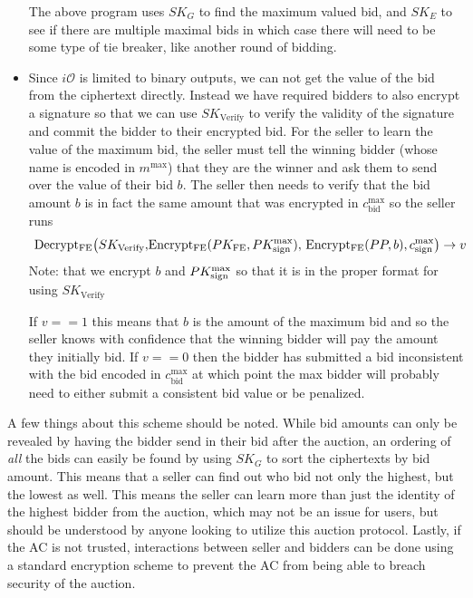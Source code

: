\documentclass[12pt,twoside]{reedthesis}
\begin{document}
\begin{itemize}
	The above program uses $SK_G$ to find the maximum valued bid, and $SK_E$ to see if there are multiple maximal bids in which case there will need to be some type of tie breaker, like another round of bidding. 
	\item Since $i\mathcal{O}$ is limited to binary outputs, we can not get the value of the bid from the ciphertext directly. Instead we have required bidders to also encrypt a signature so that we can use $SK_\text{Verify}$ to verify the validity of the signature and commit the bidder to their encrypted bid. For the seller to learn the value of the maximum bid, the seller must tell the winning bidder (whose name is encoded in $m^\text{max}$) that they are the winner and ask them to send over the value of their bid $b$. The seller then needs to verify that the bid amount $b$ is in fact the same amount that was encrypted in $c^\text{max}_\text{bid}$ so the seller runs $$\text{ Decrypt$_\text{FE}\big(SK_\text{Verify},$Encrypt$_\text{FE}(PK_\text{FE},PK_\text{sign}^\text{max}),$ Encrypt$_\text{FE}(PP, b),c_\text{sign}^\text{max}$\big)} \to v $$
Note: that we encrypt $b$ and $PK_\text{sign}^\text{max}$ so that it is in the proper format for using $SK_\text{Verify}$

\par If $v==1$ this means that $b$ is the amount of the maximum bid and so the seller knows with confidence that the winning bidder will pay the amount they initially bid. If $v == 0$ then the bidder has submitted a bid inconsistent with the bid encoded in $c_\text{bid}^\text{max}$ at which point the max bidder will probably need to either submit a consistent bid value or be penalized.
       \end{itemize}
       
       \par A few things about this scheme should be noted. While bid amounts can only be revealed by having the bidder send in their bid after the auction, an ordering of \textit{all} the bids can easily be found by using $SK_G$ to sort the ciphertexts by bid amount. This means that a seller can find out who bid not only the highest, but the lowest as well. This means the seller can learn more than just the identity of the highest bidder from the auction, which may not be an issue for users, but should be understood by anyone looking to utilize this auction protocol. Lastly, if the AC is not trusted, interactions between seller and bidders can be done using a standard encryption scheme to prevent the AC from being able to breach security of the auction.  
    
\end{document}

